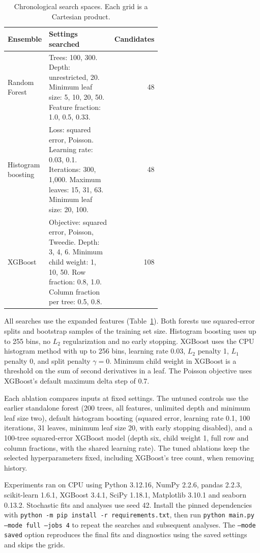 \documentclass[11pt]{article}
\begin{document}
\begin{table}[htbp]
\centering
\small
\caption{Chronological search spaces. Each grid is a Cartesian product.}
\label{tab:grid}
\begin{tabular}{@{}lp{0.60\linewidth}r@{}}
\toprule
Ensemble & Settings searched & Candidates \\
\midrule
Random Forest & Trees: 100, 300. Depth: unrestricted, 20. Minimum leaf size: 5, 10, 20, 50. Feature fraction: 1.0, 0.5, 0.33. & 48 \\
Histogram boosting & Loss: squared error, Poisson. Learning rate: 0.03, 0.1. Iterations: 300, 1,000. Maximum leaves: 15, 31, 63. Minimum leaf size: 20, 100. & 48 \\
XGBoost & Objective: squared error, Poisson, Tweedie. Depth: 3, 4, 6. Minimum child weight: 1, 10, 50. Row fraction: 0.8, 1.0. Column fraction per tree: 0.5, 0.8. & 108 \\
\bottomrule
\end{tabular}
\end{table}

All searches use the expanded features (Table~\ref{tab:grid}). Both forests use squared-error splits and bootstrap samples of the training set size. Histogram boosting uses up to 255 bins, no $L_2$ regularization and no early stopping. XGBoost uses the CPU histogram method with up to 256 bins, learning rate 0.03, $L_2$ penalty 1, $L_1$ penalty 0, and split penalty $\gamma=0$. Minimum child weight in XGBoost is a threshold on the sum of second derivatives in a leaf. The Poisson objective uses XGBoost's default maximum delta step of 0.7.

Each ablation compares inputs at fixed settings. The untuned controls use the earlier standalone forest (200 trees, all features, unlimited depth and minimum leaf size two), default histogram boosting (squared error, learning rate 0.1, 100 iterations, 31 leaves, minimum leaf size 20, with early stopping disabled), and a 100-tree squared-error XGBoost model (depth six, child weight 1, full row and column fractions, with the shared learning rate). The tuned ablations keep the selected hyperparameters fixed, including XGBoost's tree count, when removing history.

Experiments ran on CPU using Python 3.12.16, NumPy 2.2.6, pandas 2.2.3, scikit-learn 1.6.1, XGBoost 3.4.1, SciPy 1.18.1, Matplotlib 3.10.1 and seaborn 0.13.2. Stochastic fits and analyses use seed 42. Install the pinned dependencies with \texttt{python -m pip install -r requirements.txt}, then run \texttt{python main.py --mode full --jobs 4} to repeat the searches and subsequent analyses. The \texttt{--mode saved} option reproduces the final fits and diagnostics using the saved settings and skips the grids.
\end{document}
